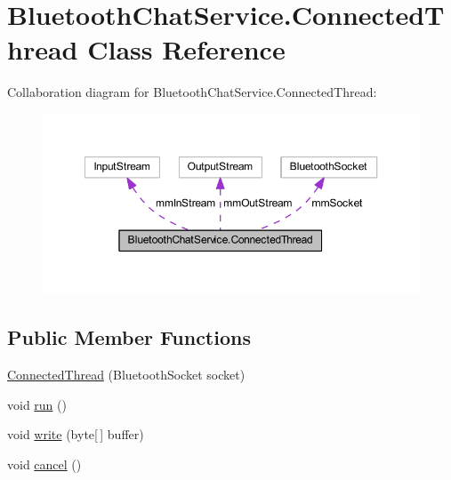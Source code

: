 \hypertarget{classcom_1_1example_1_1android_1_1_bluetooth_chat_1_1_bluetooth_chat_service_1_1_connected_thread}{\section{Bluetooth\-Chat\-Service.\-Connected\-Thread Class Reference}
\label{classcom_1_1example_1_1android_1_1_bluetooth_chat_1_1_bluetooth_chat_service_1_1_connected_thread}
}


Collaboration diagram for Bluetooth\-Chat\-Service.\-Connected\-Thread\-:\nopagebreak
\begin{figure}[H]
\begin{center}
\leavevmode
\includegraphics[width=350pt]{classcom_1_1example_1_1android_1_1_bluetooth_chat_1_1_bluetooth_chat_service_1_1_connected_thread__coll__graph}
\end{center}
\end{figure}
\subsection*{Public Member Functions}
\begin{DoxyCompactItemize}
\item 
\hyperlink{classcom_1_1example_1_1android_1_1_bluetooth_chat_1_1_bluetooth_chat_service_1_1_connected_thread_a8dc6fa71066e77167173b4e67439b691}{Connected\-Thread} (Bluetooth\-Socket socket)
\item 
void \hyperlink{classcom_1_1example_1_1android_1_1_bluetooth_chat_1_1_bluetooth_chat_service_1_1_connected_thread_a13a43e6d814de94978c515cb084873b1}{run} ()
\item 
void \hyperlink{classcom_1_1example_1_1android_1_1_bluetooth_chat_1_1_bluetooth_chat_service_1_1_connected_thread_ae29f62e52ac434bc0b80facee55ff1c8}{write} (byte\mbox{[}$\,$\mbox{]} buffer)
\item 
void \hyperlink{classcom_1_1example_1_1android_1_1_bluetooth_chat_1_1_bluetooth_chat_service_1_1_connected_thread_a02d5fa6b14e221f3012a794b905be166}{cancel} ()
\end{DoxyCompactItemize}
